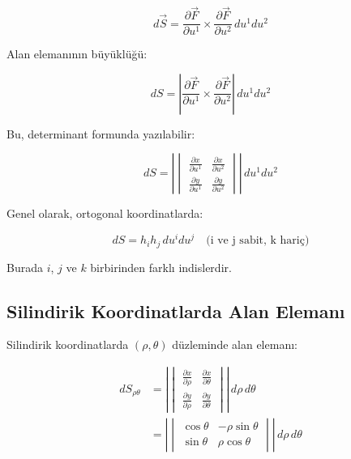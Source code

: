 \documentclass[11pt,letterpaper,twocolumn]{fenbil}
\begin{document}
\begin{equation}
d\vec{S} = \frac{\partial \vec{F}}{\partial u^1} \times \frac{\partial \vec{F}}{\partial u^2} \, du^1 du^2
\end{equation}

Alan elemanının büyüklüğü:

\begin{equation}
dS = \left|\frac{\partial \vec{F}}{\partial u^1} \times \frac{\partial \vec{F}}{\partial u^2}\right| \, du^1 du^2
\end{equation}

Bu, determinant formunda yazılabilir:

\begin{equation}
dS = \left|\begin{vmatrix}
\frac{\partial x}{\partial u^1} & \frac{\partial x}{\partial u^2} \\
\frac{\partial y}{\partial u^1} & \frac{\partial y}{\partial u^2}
\end{vmatrix}\right| \, du^1 du^2
\end{equation}

Genel olarak, ortogonal koordinatlarda:

\begin{equation}
dS = h_i h_j \, du^i du^j \quad \text{(i ve j sabit, k hariç)}
\end{equation}

Burada $i$, $j$ ve $k$ birbirinden farklı indislerdir.

\subsection{Silindirik Koordinatlarda Alan Elemanı}

Silindirik koordinatlarda $(\rho, \theta)$ düzleminde alan elemanı:

\begin{align}
dS_{\rho\theta} &= \left|\begin{vmatrix}
\frac{\partial x}{\partial \rho} & \frac{\partial x}{\partial \theta} \\
\frac{\partial y}{\partial \rho} & \frac{\partial y}{\partial \theta}
\end{vmatrix}\right| \, d\rho \, d\theta\\
&= \left|\begin{vmatrix}
\cos \theta & -\rho \sin \theta \\
\sin \theta & \rho \cos \theta
\end{vmatrix}\right| \, d\rho \, d\theta
\end{align}
\end{document}
